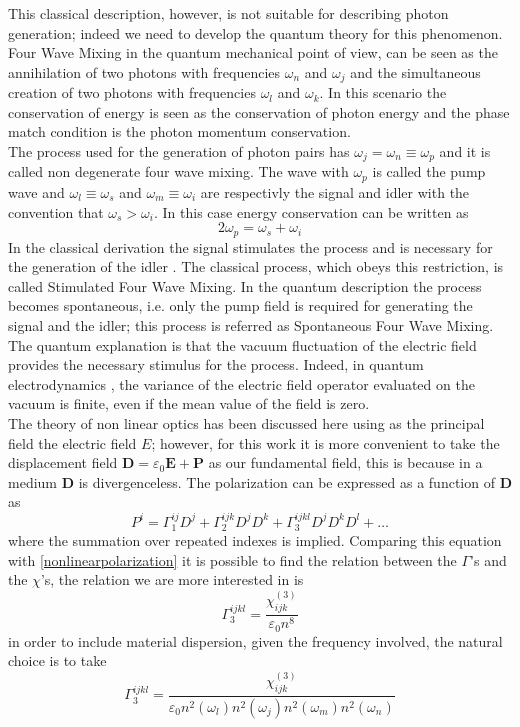 \documentclass[12pt]{book}
\begin{document}
This classical description, however, is not suitable for describing photon generation; indeed we need to develop the quantum theory for this phenomenon. Four Wave Mixing in the quantum mechanical point of view, can be seen as the annihilation of two photons with frequencies $\omega_n$ and $\omega_j$ and the simultaneous creation of two photons with frequencies $\omega_l$ and $\omega_k$. In this scenario the conservation of energy is seen as the conservation of photon energy and the phase match condition is the photon momentum conservation.\\
The process used for the generation of photon pairs has $\omega_j = \omega_n \equiv \omega_p$ and it is called non degenerate four wave mixing. The wave with $\omega_p$ is called the pump wave and $\omega_l\equiv \omega_s$ and $\omega_m \equiv \omega_i$ are respectivly the signal and idler with the convention that $\omega_s > \omega_i$. In this case energy conservation can be written as
\begin{equation}\label{conservationenergy}2\omega_p = \omega_s + \omega_i\end{equation}
In the classical derivation the signal stimulates the process and is necessary for the generation of the idler \cite{phdthesis:borghi}. The classical process, which obeys this restriction, is called Stimulated Four Wave Mixing. In the quantum description the process becomes spontaneous, i.e. only the pump field is required for generating the signal and the idler; this process is referred as Spontaneous Four Wave Mixing. The quantum explanation is that the vacuum fluctuation of the electric field provides the necessary stimulus for the process. Indeed, in quantum electrodynamics \cite{book:cohen}, the variance of the electric field operator evaluated on the vacuum is finite, even if the mean value of the field is zero.\\
The theory of non linear optics has been discussed here using as the principal field the electric field $E$; however, for this work it is more convenient to take the displacement field $\mathbf{D} = \varepsilon_0\mathbf{E} +\mathbf{P} $ as our fundamental field, this is because in a medium $\mathbf{D}$ is divergenceless. The polarization can be expressed as a function of $\mathbf{D}$ as
\begin{equation}P^i = \Gamma^{ij}_1D^j +\Gamma_2^{ijk}D^jD^k + \Gamma_3^{ijkl}D^jD^kD^l + \dots\end{equation}
where the summation over repeated indexes is implied. Comparing this equation with \eqref{nonlinearpolarization} it is possible to find the relation between the $\Gamma$'s and the $\chi$'s, the relation we are more interested in is \cite{Helt2012}
\begin{equation}\Gamma_3^{ijkl} = \frac{\chi_{ijk}^{(3)}}{\varepsilon_0 n^8}\end{equation}
in order to include material dispersion, given the frequency involved, the natural choice is to take
\begin{equation}\Gamma_3^{ijkl} = \frac{\chi_{ijk}^{(3)}}{\varepsilon_0 n^2(\omega_l)n^2(\omega_j)n^2(\omega_m)n^2(\omega_n)}\end{equation}
{}
\end{document}
